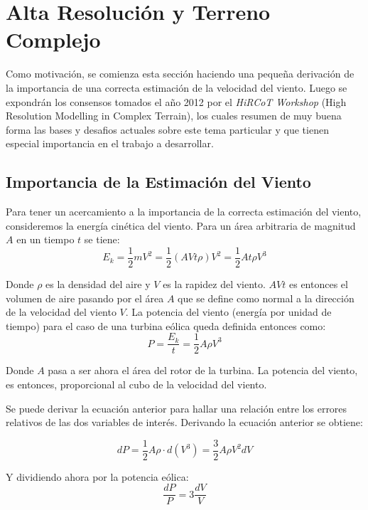 \section{Alta Resolución y Terreno Complejo}
Como motivación, se comienza esta sección haciendo una pequeña derivación de la importancia de una correcta estimación de la velocidad del viento. Luego se expondrán los consensos tomados el año 2012 por el \emph{HiRCoT Workshop} (High Resolution Modelling in Complex Terrain), los cuales resumen de muy buena forma las bases y desafios actuales sobre este tema particular y que tienen especial importancia en el trabajo a desarrollar.
\subsection{Importancia de la Estimación del Viento}
Para tener un acercamiento a la importancia de la correcta estimación del viento, consideremos la energía cinética del viento. Para un área arbitraria de magnitud $A$ en un tiempo $t$ se tiene:
\begin{equation} 
E_k = \frac{1}{2}mV^2 = \frac{1}{2}(AVt\rho)V^2 = \frac{1}{2}At\rho V^3
\end{equation}

Donde $\rho$ es la densidad del aire y $V$ es la rapidez del viento. $AVt$ es entonces el volumen de aire pasando por el área $A$ que se define como normal a la dirección de la velocidad del viento $V$. La potencia del viento (energía por unidad de tiempo) para el caso de una turbina eólica queda definida entonces como:
\begin{equation}
P = \frac{E_k}{t} = \frac{1}{2}A\rho V^3
\end{equation}

Donde $A$ pasa a ser ahora el área del rotor de la turbina. La potencia del viento, es entonces, proporcional al cubo de la velocidad del viento.

Se puede derivar la ecuación anterior para hallar una relación entre los errores relativos de las dos variables de interés. Derivando la ecuación anterior se obtiene:

\begin{equation}
dP = \frac{1}{2}A\rho\cdot d(V^3) = \frac{3}{2}A\rho V^2 dV
\end{equation}

Y dividiendo ahora por la potencia eólica:
\begin{equation}
\frac{dP}{P} = 3\frac{dV}{V}
\end{equation}

